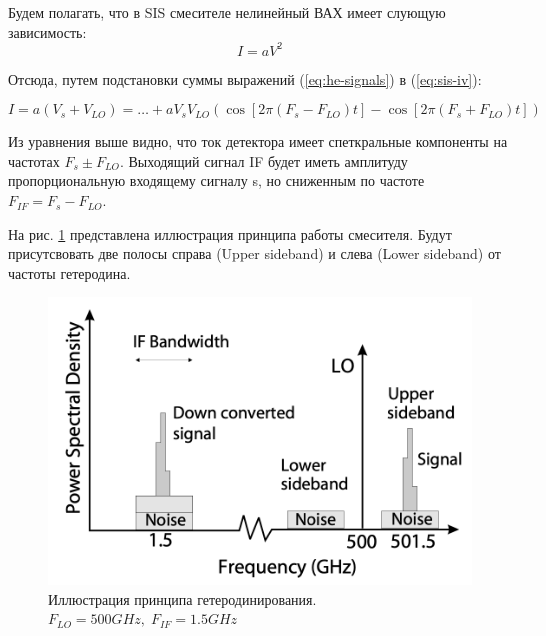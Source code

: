 \documentclass[12pt,a4paper]{article}
\begin{document}
Будем полагать, что в SIS смесителе нелинейный ВАХ имеет слующую зависимость:
\begin{equation}
    I = a V^2
    \label{eq:sis-iv}
\end{equation}

Отсюда, путем подстановки суммы выражений (\ref{eq:he-signals}) в (\ref{eq:sis-iv}):

\begin{equation}
    I = a (V_s + V_{LO}) = \ldots + aV_sV_{LO} \left(\cos{[2\pi(F_s - F_{LO})t]} - \cos{[2\pi(F_s + F_{LO})t]} \right)
\end{equation}

Из уравнения выше видно, что ток детектора имеет спеткральные компоненты на частотах $F_s \pm F_{LO}$. Выходящий сигнал IF будет иметь амплитуду пропорциональную входящему сигналу s, но сниженным по частоте $F_{IF} = F_s - F_{LO}$.\par 

На рис. \ref{mixer} представлена иллюстрация принципа работы смесителя. Будут присутсвовать две полосы справа (Upper sideband) и слева (Lower sideband) от частоты гетеродина. 

\begin{figure}[H]
    \centering
    \includegraphics[scale = 0.7]{detect.png}
    \caption{Иллюстрация принципа гетеродинирования. $F_{LO} = 500 GHz, \; F_{IF} = 1.5 GHz$}
    \label{mixer}
\end{figure}
\end{document}
